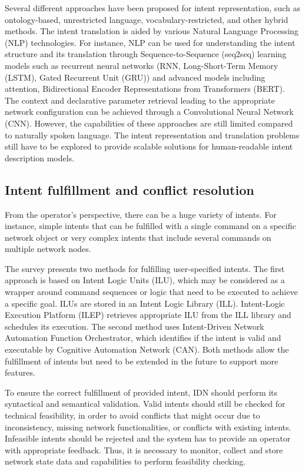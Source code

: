 Several different approaches have been proposed for intent representation, such as ontology-based, unrestricted language, vocabulary-restricted, and other hybrid methods. The intent translation is aided by various Natural Language Processing (NLP) technologies. For instance, NLP  can be used for understanding the intent structure and its translation through Sequence-to-Sequence (seq2seq) learning models such as recurrent neural networks (RNN, Long-Short-Term Memory (LSTM), Gated Recurrent Unit (GRU)) and advanced models including attention, Bidirectional Encoder Representations from Transformers (BERT). The context and declarative parameter retrieval leading to the appropriate network configuration can be achieved through a Convolutional Neural Network (CNN). However, the capabilities of these approaches are still limited compared to naturally spoken language. The intent representation and translation problems still have to be explored to provide scalable solutions for human-readable intent description models.\cite[18]{Mehmood2021} 


\subsection{Intent fulfillment and conflict resolution}

From the operator’s perspective, there can be a huge variety of intents. For instance, simple intents that can be fulfilled with a single command on a specific network object or very complex intents that include several commands on multiple network nodes.

The survey \cite{Mwanje2021} presents two methods for fulfilling user-specified intents. The first approach is based on Intent Logic Units (ILU), which may be considered as a wrapper around command sequences or logic that need to be executed to achieve a specific goal. ILUs are stored in an Intent Logic Library (ILL). Intent-Logic Execution Platform (ILEP) retrieves appropriate ILU from the ILL library and schedules its execution. The second method uses Intent-Driven Network Automation Function Orchestrator, which identifies if the intent is valid and executable by Cognitive Automation Network (CAN). Both methods allow the fulfillment of intents but need to be extended in the future to support more features.

To ensure the correct fulfillment of provided intent, IDN should perform its syntactical and semantical validation. Valid intents should still be checked for technical feasibility, in order to avoid conflicts that might occur due to inconsistency, missing network functionalities, or conflicts with existing intents. Infeasible intents should be rejected and the system has to provide an operator with appropriate feedback. Thus, it is necessary to monitor, collect and store network state data and capabilities to perform feasibility checking.

